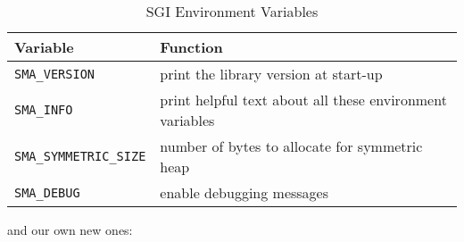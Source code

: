 \clearpage

\begin{table}[!h]
  \begin{center}
    \caption{SGI Environment Variables}
    \begin{tabular}{|l|l|}
      \hline 
      Variable & Function\tabularnewline
      \hline
      \hline 
      \texttt{SMA\_VERSION} & print the library version at start-up\tabularnewline
      \hline 
      \texttt{SMA\_INFO} & print helpful text about all these environment variables\tabularnewline
      \hline 
      \texttt{SMA\_SYMMETRIC\_SIZE} & number of bytes to allocate for symmetric heap\tabularnewline
      \hline 
      \texttt{SMA\_DEBUG} & enable debugging messages\tabularnewline
      \hline
    \end{tabular}
  \end{center}
\end{table}

and our own new ones:

